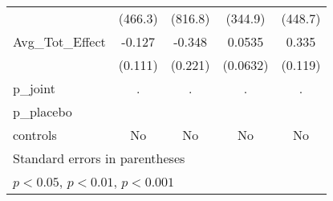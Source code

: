 {\begin{tabular}{l*{4}{c}}
            &     (466.3)         &     (816.8)         &     (344.9)         &     (448.7)         \\
\addlinespace
Avg\_Tot\_Effect&      -0.127         &      -0.348         &      0.0535         &       0.335\sym{**} \\
            &     (0.111)         &     (0.221)         &    (0.0632)         &     (0.119)         \\
\midrule
p\_joint     &           .         &           .         &           .         &           .         \\
p\_placebo   &                     &                     &                     &                     \\
controls    &          No         &          No         &          No         &          No         \\
\bottomrule
\multicolumn{5}{l}{\footnotesize Standard errors in parentheses}\\
\multicolumn{5}{l}{\footnotesize \sym{*} \(p<0.05\), \sym{**} \(p<0.01\), \sym{***} \(p<0.001\)}\\
\end{tabular}
}
